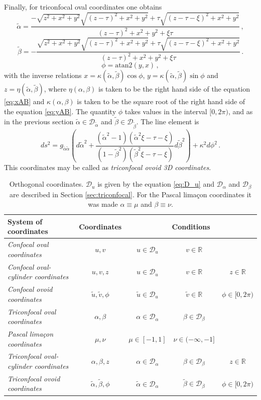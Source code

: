 \documentclass[12pt, ams, nofootinbib]{revtex4}
\def\be{\begin{equation}}
\def\ee{\end{equation}}
\newcommand{\rob}[1]{\left(#1\right)}    %
\renewcommand{\Re}{\mathbb{R}}           %
\theoremstyle{definition}
\begin{document}
Finally, for triconfocal oval coordinates one obtains
\be
	\tilde{\alpha} =  \frac{-\sqrt{z^2+x^2+y^2}\sqrt{(z-\tau)^2+x^2+y^2} + \tau \sqrt{(z-\tau-\xi)^2+x^2+y^2}}{(z-\tau)^2+x^2+y^2+\xi\tau}\,, \label{eq:alpha}
\ee
\be
	\tilde{\beta} = -\frac{\sqrt{z^2+x^2+y^2}\sqrt{(z-\tau)^2+x^2+y^2} + \tau \sqrt{(z-\tau-\xi)^2+x^2+y^2}}{(z-\tau)^2+x^2+y^2+\xi\tau}\,. \label{eq:beta}
\ee
\be
	\phi = \text{atan2}(y,x)\,, \label{eq:phi(x;y;z)}
\ee
with the inverse relations $x = \kappa(\tilde{\alpha},\tilde{\beta})\cos\phi$, $y = \kappa(\tilde{\alpha},\tilde{\beta})\sin\phi$ and $z = \eta(\tilde{\alpha},\tilde{\beta})$, where $\eta(\alpha,\beta)$ is taken to be the right hand side of the equation \ref{eq:xAB} and $\kappa(\alpha,\beta)$ is taken to be the square root of the right hand side of the equation \ref{eq:yAB}. The quantity $\phi$ takes values in the interval $[0,2\pi)$, and as in the previous section $\tilde{\alpha}\in\mathcal{D}_{\tilde{\alpha}}$ and $\tilde{\beta}\in\mathcal{D}_{\tilde{\beta}}$. The line element is
\be
	ds^2 = g_{{\tilde{\alpha}}{\tilde{\alpha}}}\rob{d{\tilde{\alpha}}^2+\frac{({\tilde{\alpha}}^2-1)({\tilde{\alpha}}^2\xi-\tau-\xi)}{(1-{\tilde{\beta}}^2)({\tilde{\beta}}^2\xi-\tau-\xi)} d{\tilde{\beta}}^2} + \kappa^2d\phi^2\,.
\ee
This coordinates may be called as \textit{triconfocal ovoid 3D coordinates}.

\begin{table}[hb]
	\centering
	\caption{Orthogonal coordinates. $\mathcal{D}_u$ is given by the equation \ref{eq:D_u} and $\mathcal{D}_\alpha$ and $\mathcal{D}_\beta$ are described in Section \ref{sec:triconfocal}. For the Pascal limaçon coordinates it was made $\alpha\equiv\mu$ and $\beta\equiv\nu$.}
	\begin{tabular}{lcccc}
	\hline
	System of coordinates & Coordinates & \multicolumn{3}{c}{Conditions} \\ \hline
	\textit{Confocal oval coordinates}	& $u,v$ & $u\in\mathcal{D}_u$ & $v\in\Re$& \\
	\textit{Confocal oval-cylinder coordinates} & $u,v,z$ & $u\in\mathcal{D}_u$& $v\in\Re$ & $z\in\Re$ \\
	\textit{Confocal ovoid coordinates} & $\tilde{u},\tilde{v},\phi$ & $\tilde{u}\in\mathcal{D}_{u}$ & $\tilde{v}\in\Re$ & $\phi\in[0,2\pi)$ \\
	\textit{Triconfocal oval coordinates} & $\alpha,\beta$ & $\alpha\in\mathcal{D}_\alpha$ & $\beta\in\mathcal{D}_\beta$ & \\
	\textit{Pascal limaçon coordinates} & $\mu,\nu$ & $\mu\in[-1,1]$& $\nu\in(-\infty,-1]$ \\
	\textit{Triconfocal oval-cylinder coordinates} & $\alpha,\beta,z$ & $\alpha\in\mathcal{D}_\alpha$& $\beta\in\mathcal{D}_\beta$& $z\in\Re$ \\
	\textit{Triconfocal ovoid coordinates} & $\tilde{\alpha},\tilde{\beta},\phi$ & $\tilde{\alpha}\in\mathcal{D}_\alpha$& $\tilde{\beta}\in\mathcal{D}_\beta$& $\phi\in[0,2\pi)$ \\ \hline
	\end{tabular}
	\label{tab:existence}
\end{table}
\end{document}
